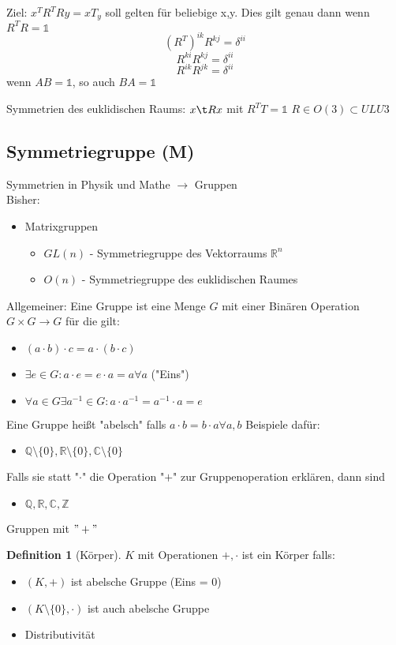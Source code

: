 \documentclass[a4paper]{scrartcl}
\DeclareMathOperator{\Exists}{\exists}
\DeclareMathOperator{\Forall}{\forall}
\theoremstyle{definition}
\newtheorem{defn}{Definition}
\theoremstyle{plain}
\theoremstyle{remark}
\theoremstyle{remark}
\begin{document}
Ziel: $x^T R^T Ry = x T_y$ soll gelten für beliebige x,y. Dies gilt genau dann wenn $R^{T} R = \mathbb{1}$
\[(R^{T})^{ik} R^{kj} = \delta^{ii}\]
\[R^{ki} R^{kj} = \delta^{ii}\]
\[R^{ik} R^{jk} = \delta^{ii}\]
wenn $AB = \mathbb{1}$, so auch $B A = \mathbb{1}$


Symmetrien des euklidischen Raums:
$x \t R x$ mit $R^{T} T = \mathbb{1}$
$R \in O(3) \subset ULU3$
\subsection{Symmetriegruppe (M)}
\label{sec-6-3}
Symmetrien in Physik und Mathe $\rightarrow$ Gruppen \\
   Bisher:
\begin{itemize}
\item Matrixgruppen
\begin{itemize}
\item $GL(n)$ - Symmetriegruppe des Vektorraums $\mathbb{R}^n$
\item $O(n)$ - Symmetriegruppe des euklidischen Raumes
\end{itemize}
\end{itemize}

Allgemeiner: Eine Gruppe ist eine Menge $G$ mit einer Binären Operation $G \times G \to G$ für die gilt:
\begin{itemize}
\item $(a \cdot b) \cdot c = a \cdot (b\cdot c)$
\item $\Exists e \in G: a\cdot e = e\cdot a = a \Forall a$ ("Eins")
\item $\Forall a\in G \Exists a^{-1} \in G: a\cdot a^{-1} = a^{-1} \cdot a = e$
\end{itemize}

Eine Gruppe heißt "abelsch" falls $a\cdot b = b\cdot a \Forall a,b$
Beispiele dafür:
\begin{itemize}
\item $\mathbb{Q}\setminus \{0\}, \mathbb{R} \setminus \{0\}, \mathbb{C} \setminus \{0\}$
\end{itemize}
Falls sie statt "$\cdot$" die Operation "$+$" zur Gruppenoperation erklären, dann sind
\begin{itemize}
\item $\mathbb{Q}, \mathbb{R}, \mathbb{C}, \mathbb{Z}$
\end{itemize}
Gruppen mit $"+"$

\begin{defn}[Körper]
$K$ mit Operationen $+,\cdot$ ist ein Körper falls:
\begin{itemize}
\item $(K,+)$ ist abelsche Gruppe (Eins = 0)
\item $(K\setminus\{0\}, \cdot)$ ist auch abelsche Gruppe
\item Distributivität
\end{itemize}
\end{defn}
\end{document}
